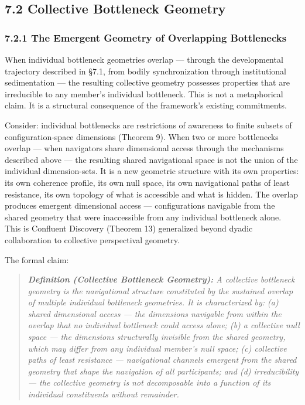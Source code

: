 \bigskip\noindent\makebox[\textwidth]{\color{rulegray}\rule{5cm}{0.3pt}}\bigskip


\subsection*{7.2 Collective Bottleneck Geometry}


\subsubsection*{7.2.1 The Emergent Geometry of Overlapping Bottlenecks}


When individual bottleneck geometries overlap — through the developmental trajectory described in §7.1, from bodily synchronization through institutional sedimentation — the resulting collective geometry possesses properties that are irreducible to any member's individual bottleneck. This is not a metaphorical claim. It is a structural consequence of the framework's existing commitments.


Consider: individual bottlenecks are restrictions of awareness to finite subsets of configuration-space dimensions (Theorem 9). When two or more bottlenecks overlap — when navigators share dimensional access through the mechanisms described above — the resulting shared navigational space is not the union of the individual dimension-sets. It is a new geometric structure with its own properties: its own coherence profile, its own null space, its own navigational paths of least resistance, its own topology of what is accessible and what is hidden. The overlap produces emergent dimensional access — configurations navigable from the shared geometry that were inaccessible from any individual bottleneck alone. This is Confluent Discovery (Theorem 13) generalized beyond dyadic collaboration to collective perspectival geometry.


The formal claim:


\begin{quote}
\itshape
\textbf{Definition (Collective Bottleneck Geometry):} \textit{A collective bottleneck geometry is the navigational structure constituted by the sustained overlap of multiple individual bottleneck geometries. It is characterized by: (a) shared dimensional access — the dimensions navigable from within the overlap that no individual bottleneck could access alone; (b) a collective null space — the dimensions structurally invisible from the shared geometry, which may differ from any individual member's null space; (c) collective paths of least resistance — navigational channels emergent from the shared geometry that shape the navigation of all participants; and (d) irreducibility — the collective geometry is not decomposable into a function of its individual constituents without remainder.}
\end{quote}


